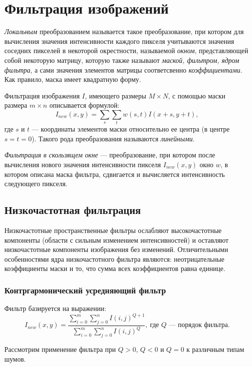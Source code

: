 \section{Фильтрация изображений}
\textit{Локальным} преобразованием называется такое преобразование, при котором для вычисления значения интенсивности каждого пикселя учитываются значения соседних пикселей в некоторой окрестности, называемой \textit{окном}, представляющей собой некоторую матрицу, которую также называют \textit{маской, фильтром, ядром фильтра}, а сами значения элементов
матрицы соответсвенно \textit{коэффициентами}. Как правило, маска имеет квадратную форму.

Фильтрация изображения $I$, имеющего размеры $M \times N$, с помощью маски размера $m \times n$ описывается формулой:
\begin{equation}
    I_{new}(x,y) = \sum_s \sum_t w(s,t) I(x+s,y+t),
\end{equation}
где $s$ и $t$ — координаты элементов маски относительно ее центра (в
центре $s = t = 0$). Такого рода преобразования называются \textit{линейными}.

\textit{Фильтрация в скользящем окне} — преобразование, при котором после вычисления нового значения интенсивности пикселя $I_{new}(x,y)$ окно $w$, в котором описана маска фильтра, сдвигается и
вычисляется интенсивность следующего пикселя.

\subsection{Низкочастотная фильтрация}
Низкочастотные пространственные фильтры ослабляют высокочастотные компоненты (области с сильным изменением интенсивностей) и оставляют низкочастотные компоненты изображения
без изменений. Отличительными особенностями
ядра низкочастотного фильтра являются: неотрицательные коэффициенты маски и то, что сумма всех коэффициентов равна единице.

\subsubsection{Контргармонический усредняющий фильтр}
Фильтр базируется на выражении:
\begin{equation}
    I_{new}(x,y) = \frac{\sum_{i=0}^m \sum_{j=0}^n I(i,j)^{Q+1}}{\sum_{i=0}^m \sum_{j=0}^n I(i,j)^Q}, \: \text{где $Q$ — порядок фильтра.}
\end{equation}


Рассмотрим применение фильтра при $Q > 0$, $Q < 0$ и $Q = 0$ к различным типам шумов. 

